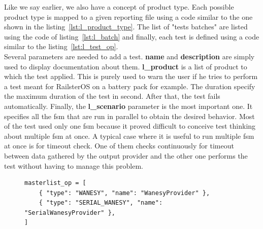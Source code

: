 \documentclass[12pt]{article}
\theoremstyle{definition}
\theoremstyle{definition}
\begin{document}
Like we say earlier, we also have a concept of product type. Each possible product type is mapped to a given reporting file using a code similar to the one shown in the listing~\ref{lst:l_product_type}. The list of "tests batches" are listed using the code of listing~\ref{lst:l_batch} and finally, each test is defined using a code similar to the listing~\ref{lst:l_test_op}.\\

Several parameters are needed to add a test. \textbf{name} and \textbf{description} are simply used to display documentation about them. \textbf{l\_product} is a list of product to which the test applied. This is purely used to warn the user if he tries to perform a test meant for RailsterOS on a battery pack for example. The duration specify the maximum duration of the test in second. After that, the test fails automatically. Finally, the \textbf{l\_scenario} parameter is the most important one. It specifies all the \gls{fsm} that are run in parallel to obtain the desired behavior. Most of the test used only one \gls{fsm} because it proved difficult to conceive test thinking about multiple \gls{fsm} at once. A typical case where it is useful to run multiple \gls{fsm} at once is for timeout check. One of them checks continuously for timeout between data gathered by the output provider and the other one performs the test without having to manage this problem.\\

\begin{figure}
    \label{masterlist_op}
    \begin{lstlisting}[frame=single,caption="Output provider configuration",label={lst:masterlist_op}]
masterlist_op = [
    { "type": "WANESY", "name": "WanesyProvider" },
    { "type": "SERIAL_WANESY", "name": "SerialWanesyProvider" },
]
    \end{lstlisting}
\end{figure}
\end{document}
